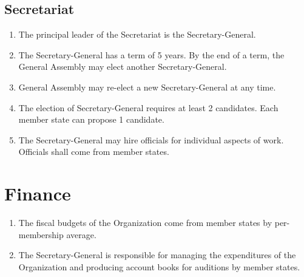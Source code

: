 \documentclass[11pt,a4paper]{article}
\begin{document}
\subsection{Secretariat}
\begin{enumerate}
	\item The principal leader of the Secretariat is the Secretary-General.
	\item The Secretary-General has a term of 5 years. By the end of a term, the General Assembly may elect another Secretary-General.
	\item General Assembly may re-elect a new Secretary-General at any time.
	\item The election of Secretary-General requires at least 2 candidates. Each member state can propose 1 candidate.
	\item The Secretary-General may hire officials for individual aspects of work. Officials shall come from member states.
\end{enumerate}



\section{Finance}
\begin{enumerate}
	\item The fiscal budgets of the Organization come from member states by per-membership average.
	\item The Secretary-General is responsible for managing the expenditures of the Organization and
	      producing account books for auditions by member states.
\end{enumerate}
\end{document}
